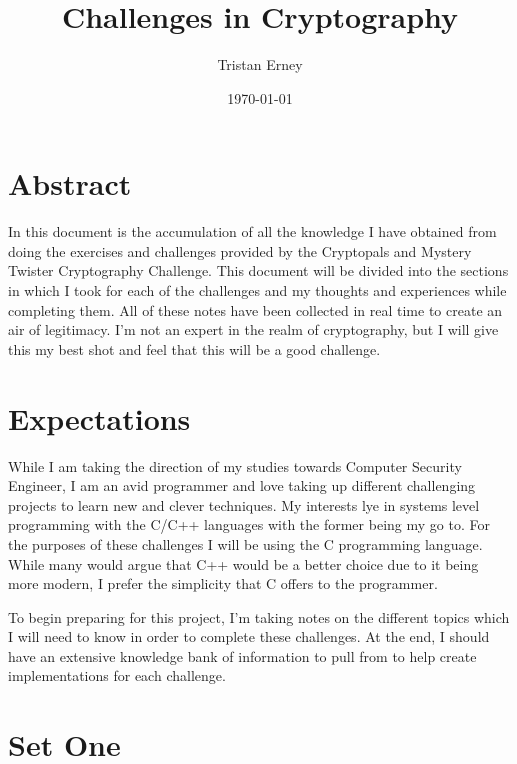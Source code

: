 \documentclass{report}
\title{\textbf{Challenges in Cryptography}}
\author{Tristan Erney}
\date{\today}
\begin{document}
	
	\maketitle
	\tableofcontents
	\pagebreak
	
	\section*{Abstract}
		In this document is the accumulation of all the knowledge I have obtained from doing the exercises and challenges 
		provided by the Cryptopals and Mystery Twister Cryptography Challenge. This document will be divided into the sections in which I took for each of the challenges and my thoughts and experiences while completing them. All of these notes have been collected in real time to create an air of legitimacy. I'm not an expert in the realm of cryptography, but I will give this my best shot and feel that this will be a good challenge.
	
	\pagebreak
	\section*{Expectations}
		While I am taking the direction of my studies towards Computer Security Engineer, I am an avid programmer and love taking up different challenging projects to learn new and clever techniques. My interests lye in systems level programming with the C/C++ languages with the former being my go to. For the purposes of these challenges I will be using the C programming language. While many would argue that C++ would be a better choice due to it being more modern, I prefer the simplicity that C offers to the programmer. 
		\par 
		To begin preparing for this project, I'm taking notes on the different topics which I will need to know in order to complete these challenges. At the end, I should have an extensive knowledge bank of information to pull from to  help create implementations for each challenge.
	
	\section*{Set One}
\end{document}
